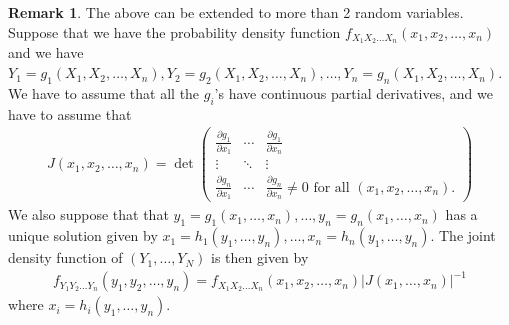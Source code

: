 \documentclass[15pt,a4paper]{book}
\theoremstyle{definition}
\newtheorem{remark}[theorem]{Remark}
\newcommand{\abs}[1]{\left| #1 \right|} %
\begin{document}
\begin{remark}
    The above can be extended to more than 2 random variables. Suppose that we have the probability density function $f_{X_{1}X_{2}\ldots X_{n}}(x_{1},x_{2},\ldots,x_{n})$ and we have $Y_{1} = g_{1}(X_{1},X_{2},\ldots,X_{n}), Y_{2} = g_{2}(X_{1},X_{2},\ldots,X_{n}),\ldots,Y_{n}=g_{n}(X_{1},X_{2},\ldots,X_{n})$. We have to assume that all the $g_{i}$'s have continuous partial derivatives, and we have to assume that
    \begin{align}
        J(x_{1},x_{2},\ldots,x_{n}) = \det \begin{pmatrix}
            \frac{\partial g_{1}}{\partial x_{1}} & \cdots & \frac{\partial g_{1}}{\partial x_{n}} \\
            \vdots & \ddots & \vdots \\
            \frac{\partial g_{n}}{\partial x_{1}} & \cdots & \frac{\partial g_{n}}{\partial x_{n}} \neq 0 \text{ for all } (x_{1},x_{2},\ldots,x_{n}).
        \end{pmatrix}
    \end{align}
    We also suppose that that $y_{1} = g_{1}(x_{1},\ldots,x_{n}),\ldots,y_{n} = g_{n}(x_{1},\ldots,x_{n})$ has a unique solution given by $x_{1} = h_{1}(y_{1},\ldots,y_{n}), \ldots, x_{n}=h_{n}(y_{1},\ldots,y_{n})$. The joint density function of $(Y_{1},\ldots,Y_{N})$ is then given by
    \begin{align}
        f_{Y_{1}Y_{2}\ldots Y_{n}}(y_{1},y_{2},\ldots,y_{n}) = f_{X_{1}X_{2}\ldots X_{n}}(x_{1},x_{2},\ldots,x_{n}) \abs{J(x_{1},\ldots,x_{n})}^{-1}
    \end{align}
    where $x_{i} = h_{i}(y_{1},\ldots,y_{n})$.
\end{remark}
\end{document}
